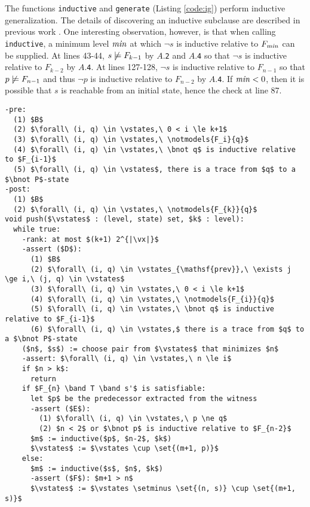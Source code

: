 \documentclass{llncs}
\newcommand{\set}[1]{ \{ #1 \} }
\newcommand{\band}{\wedge}
\newcommand{\bnot}{\neg}
\begin{document}
The functions {\tt inductive} and {\tt generate} (Listing
\ref{code:ig}) perform inductive generalization.  The details of
discovering an inductive subclause are described in previous work
\cite{Bradley+Manna/2007}.  One interesting observation, however, is
that when calling {\tt inductive}, a minimum level $\vmin$ at which
$\bnot s$ is inductive relative to $F_{\vmin}$ can be supplied.  At
lines 43-44, $\notmodels{F_{k-1}}{s}$ by $A$.{\tt 2} and $A$.{\tt 4}
so that $\bnot s$ is inductive relative to $F_{k-2}$ by $A$.{\tt 4}.
At lines 127-128, $\bnot s$ is inductive relative to $F_{n-1}$ so that
$\notmodels{F_{n-1}}{p}$ and thus $\bnot p$ is inductive relative to
$F_{n-2}$ by $A$.{\tt 4}.  If $\vmin < 0$, then it is possible that
$s$ is reachable from an initial state, hence the check at line 87.

\begin{lstlisting}[name=code,caption={The {\tt push} function for $k$-step relative inductive generalization},label=code:push,float=tb]
-pre:  
  (1) $B$
  (2) $\forall\ (i, q) \in \vstates,\ 0 < i \le k+1$
  (3) $\forall\ (i, q) \in \vstates,\ \notmodels{F_i}{q}$
  (4) $\forall\ (i, q) \in \vstates,\ \bnot q$ is inductive relative to $F_{i-1}$
  (5) $\forall\ (i, q) \in \vstates$, there is a trace from $q$ to a $\bnot P$-state
-post:
  (1) $B$
  (2) $\forall\ (i, q) \in \vstates,\ \notmodels{F_{k}}{q}$
void push($\vstates$ : (level, state) set, $k$ : level):
  while true:
    -rank: at most $(k+1) 2^{|\vx|}$
    -assert ($D$):
      (1) $B$
      (2) $\forall\ (i, q) \in \vstates_{\mathsf{prev}},\ \exists j \ge i,\ (j, q) \in \vstates$
      (3) $\forall\ (i, q) \in \vstates,\ 0 < i \le k+1$
      (4) $\forall\ (i, q) \in \vstates,\ \notmodels{F_{i}}{q}$
      (5) $\forall\ (i, q) \in \vstates,\ \bnot q$ is inductive relative to $F_{i-1}$
      (6) $\forall\ (i, q) \in \vstates,$ there is a trace from $q$ to a $\bnot P$-state
    ($n$, $s$) := choose pair from $\vstates$ that minimizes $n$
    -assert: $\forall\ (i, q) \in \vstates,\ n \le i$
    if $n > k$:
      return
    if $F_{n} \band T \band s'$ is satisfiable:
      let $p$ be the predecessor extracted from the witness
      -assert ($E$):
        (1) $\forall\ (i, q) \in \vstates,\ p \ne q$
        (2) $n < 2$ or $\bnot p$ is inductive relative to $F_{n-2}$
      $m$ := inductive($p$, $n-2$, $k$)
      $\vstates$ := $\vstates \cup \set{(m+1, p)}$
    else:
      $m$ := inductive($s$, $n$, $k$)
      -assert ($F$): $m+1 > n$
      $\vstates$ := $\vstates \setminus \set{(n, s)} \cup \set{(m+1, s)}$
\end{lstlisting}
\end{document}
